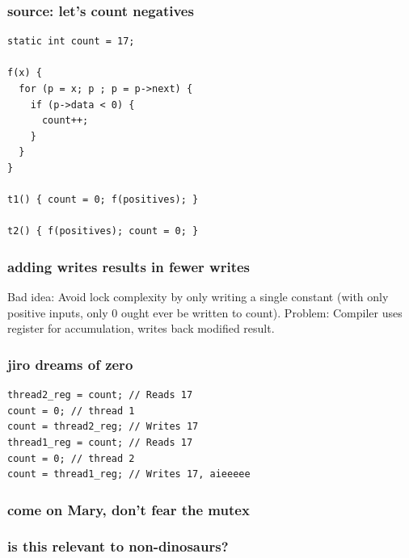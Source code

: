 \documentclass{beamer}
\begin{document}
\begin{frame}[fragile]
\frametitle{source: let's count negatives}
\begin{lstlisting}
static int count = 17;

f(x) {
  for (p = x; p ; p = p->next) {
    if (p->data < 0) {
      count++;
    }
  }
}

t1() { count = 0; f(positives); }

t2() { f(positives); count = 0; }
\end{lstlisting}
\end{frame}

\begin{frame}
\frametitle{adding writes results in fewer writes}
Bad idea: Avoid lock complexity by only writing a single constant (with only positive inputs, only 0 ought ever be written to count).
\vfill
Problem: Compiler uses register for accumulation, writes back modified result.
\end{frame}

\begin{frame}[fragile]
\frametitle{jiro dreams of zero}
\begin{lstlisting}
thread2_reg = count; // Reads 17
count = 0; // thread 1
count = thread2_reg; // Writes 17
thread1_reg = count; // Reads 17
count = 0; // thread 2
count = thread1_reg; // Writes 17, aieeeee
\end{lstlisting}
\end{frame}

\begin{frame}
\frametitle{come on Mary, don't fear the mutex}
\end{frame}

\begin{frame}
\frametitle{is this relevant to non-dinosaurs?}
\end{frame}
\end{document}
